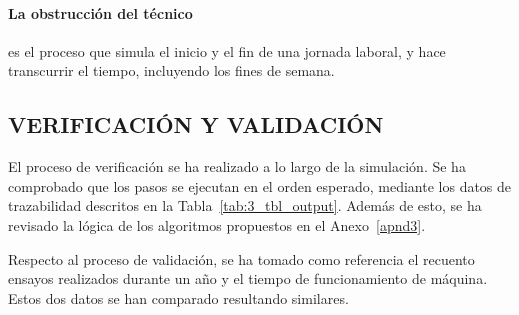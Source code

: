 \paragraph{La obstrucción del técnico}
es el proceso que simula el inicio y el fin de una jornada laboral,
y hace transcurrir el tiempo, incluyendo los fines de semana.

\subsection{VERIFICACIÓN Y VALIDACIÓN}

El proceso de verificación se ha realizado a lo largo de la simulación.
Se ha comprobado que los pasos se ejecutan en el orden esperado,
mediante los datos de trazabilidad descritos en la Tabla~\ref{tab:3_tbl_output}.
Además de esto, se ha revisado la lógica de los algoritmos propuestos
en el Anexo~\ref{apnd3}.

Respecto al proceso de validación,
se ha tomado como referencia el recuento ensayos realizados durante un año
y el tiempo de funcionamiento de máquina.
Estos dos datos se han comparado resultando similares.
